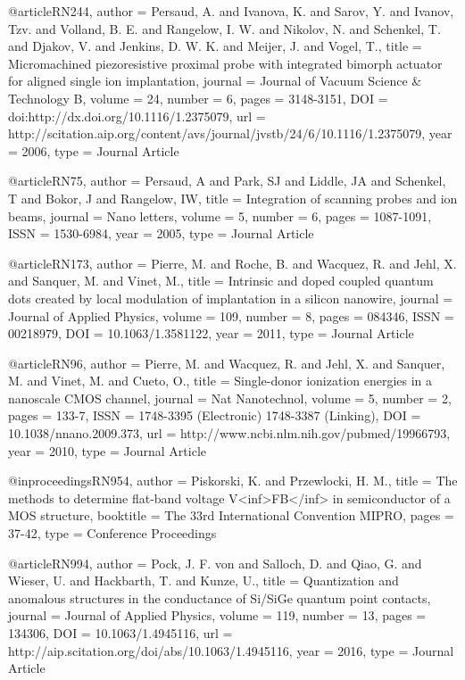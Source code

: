 @article{RN244,
   author = {Persaud, A. and Ivanova, K. and Sarov, Y. and Ivanov, Tzv. and Volland, B. E. and Rangelow, I. W. and Nikolov, N. and Schenkel, T. and Djakov, V. and Jenkins, D. W. K. and Meijer, J. and Vogel, T.},
   title = {Micromachined piezoresistive proximal probe with integrated bimorph actuator for aligned single ion implantation},
   journal = {Journal of Vacuum Science & Technology B},
   volume = {24},
   number = {6},
   pages = {3148-3151},
   DOI = {doi:http://dx.doi.org/10.1116/1.2375079},
   url = {http://scitation.aip.org/content/avs/journal/jvstb/24/6/10.1116/1.2375079},
   year = {2006},
   type = {Journal Article}
}

@article{RN75,
   author = {Persaud, A and Park, SJ and Liddle, JA and Schenkel, T and Bokor, J and Rangelow, IW},
   title = {Integration of scanning probes and ion beams},
   journal = {Nano letters},
   volume = {5},
   number = {6},
   pages = {1087-1091},
   ISSN = {1530-6984},
   year = {2005},
   type = {Journal Article}
}

@article{RN173,
   author = {Pierre, M. and Roche, B. and Wacquez, R. and Jehl, X. and Sanquer, M. and Vinet, M.},
   title = {Intrinsic and doped coupled quantum dots created by local modulation of implantation in a silicon nanowire},
   journal = {Journal of Applied Physics},
   volume = {109},
   number = {8},
   pages = {084346},
   ISSN = {00218979},
   DOI = {10.1063/1.3581122},
   year = {2011},
   type = {Journal Article}
}

@article{RN96,
   author = {Pierre, M. and Wacquez, R. and Jehl, X. and Sanquer, M. and Vinet, M. and Cueto, O.},
   title = {Single-donor ionization energies in a nanoscale CMOS channel},
   journal = {Nat Nanotechnol},
   volume = {5},
   number = {2},
   pages = {133-7},
   ISSN = {1748-3395 (Electronic)
1748-3387 (Linking)},
   DOI = {10.1038/nnano.2009.373},
   url = {http://www.ncbi.nlm.nih.gov/pubmed/19966793},
   year = {2010},
   type = {Journal Article}
}

@inproceedings{RN954,
   author = {Piskorski, K. and Przewlocki, H. M.},
   title = {The methods to determine flat-band voltage V<inf>FB</inf> in semiconductor of a MOS structure},
   booktitle = {The 33rd International Convention MIPRO},
   pages = {37-42},
   type = {Conference Proceedings}
}

@article{RN994,
   author = {Pock, J. F. von and Salloch, D. and Qiao, G. and Wieser, U. and Hackbarth, T. and Kunze, U.},
   title = {Quantization and anomalous structures in the conductance of Si/SiGe quantum point contacts},
   journal = {Journal of Applied Physics},
   volume = {119},
   number = {13},
   pages = {134306},
   DOI = {10.1063/1.4945116},
   url = {http://aip.scitation.org/doi/abs/10.1063/1.4945116},
   year = {2016},
   type = {Journal Article}
}

